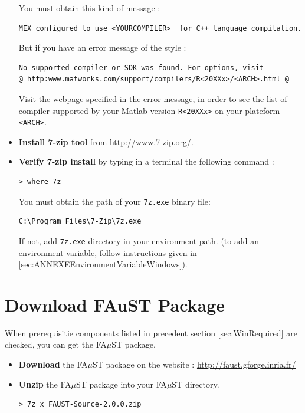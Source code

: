 \begin{itemize}
You must obtain this kind of message :
\begin{lstlisting}
MEX configured to use <YOURCOMPILER>  for C++ language compilation.
\end{lstlisting}

But if you have an error message of the style :
\begin{lstlisting}[moredelim={**[is][\color{blue}]{@}{@}},moredelim={[is][\underbar]{_}{_}}]
No supported compiler or SDK was found. For options, visit 
@_http:www.matworks.com/support/compilers/R<20XXx>/<ARCH>.html_@
\end{lstlisting}
Visit the webpage specified in the error message,
in order to see the list of compiler supported by your Matlab version \texttt{R<20XXx>} on your plateform \texttt{<ARCH>}.

\item \textbf{Install 7-zip tool} from \url{http://www.7-zip.org/}. 

\item \textbf{Verify 7-zip install} by typing in a terminal the following command : 
\lstset{style=customBash}
\begin{lstlisting}
> where 7z
\end{lstlisting}
You must obtain the path of your \texttt{7z.exe} binary file: 
\begin{lstlisting}
C:\Program Files\7-Zip\7z.exe
\end{lstlisting}
If not, add \texttt{7z.exe} directory in your environment path. 
(to add an environment variable, follow instructions given in \ref{sec:ANNEXEEnvironmentVariableWindows}). 

\end{itemize}

\section{Download FAuST Package}\label{sec:WinDownload}
When prerequisitie components listed in precedent section \ref{sec:WinRequired} are checked, you can get the FA$\mu$ST package.
\begin{itemize}
\item \textbf{Download} the FA$\mu$ST package on the website : \url{http://faust.gforge.inria.fr/}
\item \textbf{Unzip} the FA$\mu$ST package into your FA$\mu$ST directory. 
\lstset{style=customBash}
\begin{lstlisting}
> 7z x FAUST-Source-2.0.0.zip
\end{lstlisting}
\end{itemize}


